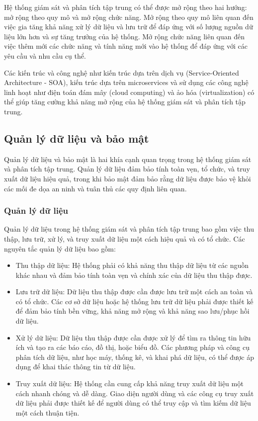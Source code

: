 Hệ thống giám sát và phân tích tập trung có thể được mở rộng theo hai hướng: mở rộng theo quy mô và mở rộng chức năng. Mở rộng theo quy mô liên quan đến việc gia tăng khả năng xử lý dữ liệu và lưu trữ để đáp ứng với số lượng nguồn dữ liệu lớn hơn và sự tăng trưởng của hệ thống. Mở rộng chức năng liên quan đến việc thêm mới các chức năng và tính năng mới vào hệ thống để đáp ứng với các yêu cầu và nhu cầu cụ thể.

Các kiến trúc và công nghệ như kiến trúc dựa trên dịch vụ (Service-Oriented Architecture - SOA), kiến trúc dựa trên microservices và sử dụng các công nghệ linh hoạt như điện toán đám mây (cloud computing) và ảo hóa (virtualization) có thể giúp tăng cường khả năng mở rộng của hệ thống giám sát và phân tích tập trung.

\subsection{Quản lý dữ liệu và bảo mật}
Quản lý dữ liệu và bảo mật là hai khía cạnh quan trọng trong hệ thống giám sát và phân tích tập trung. Quản lý dữ liệu đảm bảo tính toàn vẹn, tổ chức, và truy xuất dữ liệu hiệu quả, trong khi bảo mật đảm bảo rằng dữ liệu được bảo vệ khỏi các mối đe dọa an ninh và tuân thủ các quy định liên quan.

\subsubsection{Quản lý dữ liệu}
    
Quản lý dữ liệu trong hệ thống giám sát và phân tích tập trung bao gồm việc thu thập, lưu trữ, xử lý, và truy xuất dữ liệu một cách hiệu quả và có tổ chức. Các nguyên tắc quản lý dữ liệu bao gồm:

\begin{itemize}
    \item Thu thập dữ liệu: Hệ thống phải có khả năng thu thập dữ liệu từ các nguồn khác nhau và đảm bảo tính toàn vẹn và chính xác của dữ liệu thu thập được.
    \item Lưu trữ dữ liệu: Dữ liệu thu thập được cần được lưu trữ một cách an toàn và có tổ chức. Các cơ sở dữ liệu hoặc hệ thống lưu trữ dữ liệu phải được thiết kế để đảm bảo tính bền vững, khả năng mở rộng và khả năng sao lưu/phục hồi dữ liệu.
    \item Xử lý dữ liệu: Dữ liệu thu thập được cần được xử lý để tìm ra thông tin hữu ích và tạo ra các báo cáo, đồ thị, hoặc biểu đồ. Các phương pháp và công cụ phân tích dữ liệu, như học máy, thống kê, và khai phá dữ liệu, có thể được áp dụng để khai thác thông tin từ dữ liệu.
    \item Truy xuất dữ liệu: Hệ thống cần cung cấp khả năng truy xuất dữ liệu một cách nhanh chóng và dễ dàng. Giao diện người dùng và các công cụ truy xuất dữ liệu phải được thiết kế để người dùng có thể truy cập và tìm kiếm dữ liệu một cách thuận tiện.
\end{itemize}

